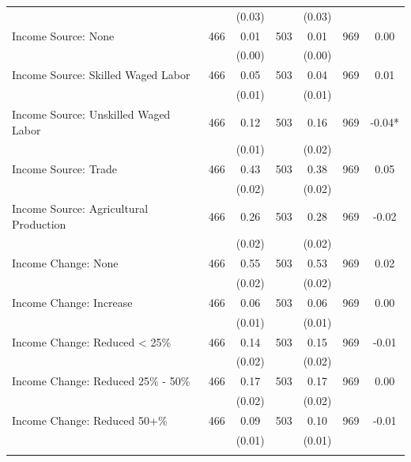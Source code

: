 \begin{tabular}{@{\extracolsep{5pt}}lcccccc}
 &   & (0.03)  &   & (0.03)  &   &  \\ [1ex]
Income Source: None   & 466    & 0.01    & 503    & 0.01    & 969    & 0.00   \\
 &   & (0.00)  &   & (0.00)  &   &  \\ [1ex]
Income Source: Skilled Waged Labor   & 466    & 0.05    & 503    & 0.04    & 969    & 0.01   \\
 &   & (0.01)  &   & (0.01)  &   &  \\ [1ex]
Income Source: Unskilled Waged Labor   & 466    & 0.12    & 503    & 0.16    & 969    & -0.04*   \\
 &   & (0.01)  &   & (0.02)  &   &  \\ [1ex]
Income Source: Trade   & 466    & 0.43    & 503    & 0.38    & 969    & 0.05   \\
 &   & (0.02)  &   & (0.02)  &   &  \\ [1ex]
Income Source: Agricultural Production   & 466    & 0.26    & 503    & 0.28    & 969    & -0.02   \\
 &   & (0.02)  &   & (0.02)  &   &  \\ [1ex]
Income Change: None   & 466    & 0.55    & 503    & 0.53    & 969    & 0.02   \\
 &   & (0.02)  &   & (0.02)  &   &  \\ [1ex]
Income Change: Increase   & 466    & 0.06    & 503    & 0.06    & 969    & 0.00   \\
 &   & (0.01)  &   & (0.01)  &   &  \\ [1ex]
Income Change: Reduced < 25\%   & 466    & 0.14    & 503    & 0.15    & 969    & -0.01   \\
 &   & (0.02)  &   & (0.02)  &   &  \\ [1ex]
Income Change: Reduced 25\% - 50\%   & 466    & 0.17    & 503    & 0.17    & 969    & 0.00   \\
 &   & (0.02)  &   & (0.02)  &   &  \\ [1ex]
Income Change: Reduced 50+\%   & 466    & 0.09    & 503    & 0.10    & 969    & -0.01   \\
 &   & (0.01)  &   & (0.01)  &   &  \\ [1ex]
\hline \hline \\[-1.8ex]

\end{tabular}
